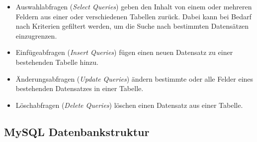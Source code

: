 \documentclass[a4paper,11pt]{report}
\begin{document}
				\begin{itemize}
					\item Auswahlabfragen (\emph{Select Queries}) geben den Inhalt von einem oder mehreren Feldern aus einer oder verschiedenen Tabellen zurück. Dabei kann bei Bedarf nach Kriterien gefiltert werden, um die Suche nach bestimmten Datensätzen einzugrenzen.\cite[S. 746]{IT-Handbuch}
					\item Einfügeabfragen (\emph{Insert Queries}) fügen einen neuen Datensatz zu einer bestehenden Tabelle hinzu.\cite[S. 746]{IT-Handbuch}
					\item Änderungsabfragen (\emph{Update Queries}) ändern bestimmte oder alle Felder eines bestehenden Datensatzes in einer Tabelle.\cite[S. 746]{IT-Handbuch}
					\item Löschabfragen (\emph{Delete Queries}) löschen einen Datensatz aus einer Tabelle. \cite[S. 746]{IT-Handbuch}
				\end{itemize}
				
				\subsection{MySQL Datenbankstruktur} \label{databankstructure}
				
\end{document}

